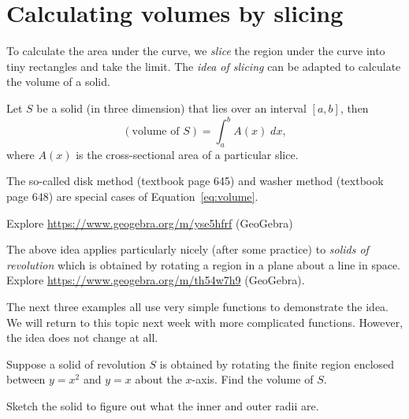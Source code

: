 \documentclass[../main.tex]{subfiles}
\begin{document}
 \section{Calculating volumes by slicing}
To calculate the area under the curve, we \emph{slice} the region under the curve into tiny rectangles and take the limit. The \emph{idea of slicing} can be adapted to calculate the volume of a solid.

\begin{mdframed}[style=withref-compact]
  Let \(S\) be a solid (in three dimension) that lies over an interval \([a,b]\), then
  \begin{equation} \label{eq:volume}
    (\text{volume of } S) = \int_{a}^{b} A(x) \;dx,
  \end{equation}
  where \(A(x)\) is the cross-sectional area of a particular slice.

  The so-called disk method (textbook page 645) and washer method (textbook page 648) are special cases of Equation~\eqref{eq:volume}.
\end{mdframed}

{\footnotesize Explore \url{https://www.geogebra.org/m/yse5hfrf} (GeoGebra)}



The above idea applies particularly nicely (after some practice) to \emph{solids of revolution} which is obtained by rotating a region in a plane about a line in space. \\
{\footnotesize Explore \url{https://www.geogebra.org/m/th54w7h9} (GeoGebra).}

\clearpage


The next three examples all use very simple functions to demonstrate the idea. We will return to this topic next week with more complicated functions. However, the idea does not change at all.

\begin{example}
  Suppose a solid of revolution \(S\) is obtained by rotating the finite region enclosed between \(y = x^{2}\) and \(y = x\) about the \(x\)-axis. Find the volume of \(S\).


  Sketch the solid to figure out what the inner and outer radii are.

  

\end{example}
\clearpage
\end{document}
